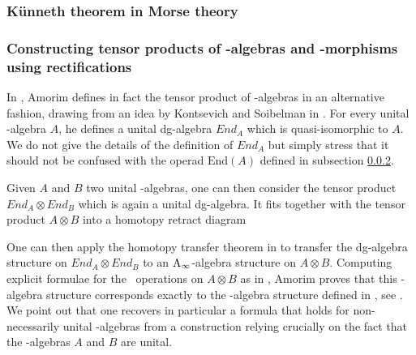 \documentclass[twoside, 12pt]{amsart}
\theoremstyle{remark}
\begin{document}
\subsubsection{K\"unneth theorem in Morse theory}


\subsubsection{Constructing tensor products of \Ainf -algebras and \Ainf -morphisms using rectifications}

In \cite{}, Amorim defines in fact the tensor product of \Ainf -algebras in an alternative fashion, drawing from an idea by Kontsevich and Soibelman in \cite{}. 
For every unital \Ainf -algebra $A$, he defines a unital dg-algebra $End_A$ which is quasi-isomorphic to $A$. We do not give the details of the definition of $End_A$ but simply stress that it should not be confused with the operad $\mathrm{End}(A)$ defined in subsection \ref{}. 

Given $A$ and $B$ two unital \Ainf -algebras, one can then consider the tensor product $End_A \otimes End_B$ which is again a unital dg-algebra. It fits together with the tensor product $A \otimes B$ into a homotopy retract diagram 
\begin{center} 
\end{center}
One can then apply the homotopy transfer theorem in \cite{} to transfer the dg-algebra structure on $End_A \otimes End_B$ to an $\mathrm{A}_\infty$-algebra structure on $A \otimes B$. 
Computing explicit formulae for the \Ainf\ operations on $A \otimes B$ as in \cite{}, Amorim proves that this \Ainf -algebra structure corresponds exactly to the \Ainf -algebra structure defined in \cite{MarklShnider06,MTTV19}, see \cite[Corollary 4.2]{amorim-tensor}.
We point out that one recovers in particular a formula that holds for non-necessarily unital \Ainf -algebras from a construction relying crucially on the fact that the \Ainf -algebras $A$ and $B$ are unital.
\end{document}
